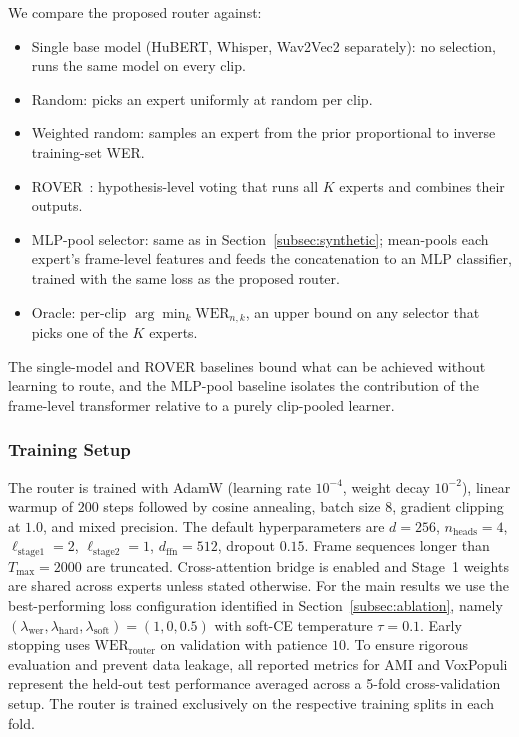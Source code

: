 \documentclass[journal]{IEEEtran}
\begin{document}
We compare the proposed router against:
\begin{itemize}
    \item Single base model (HuBERT, Whisper, Wav2Vec2 separately): no
    selection, runs the same model on every clip.
    \item Random: picks an expert uniformly at random per clip.
    \item Weighted random: samples an expert from the prior
    proportional to inverse training-set WER.
    \item ROVER~\cite{fiscus1997rover}: hypothesis-level voting that
    runs all $K$ experts and combines their outputs.
    \item MLP-pool selector: same as in
    Section~\ref{subsec:synthetic}; mean-pools each expert's
    frame-level features and feeds the concatenation to an MLP
    classifier, trained with the same loss as the proposed router.
    \item Oracle: per-clip $\arg\min_k\mathrm{WER}_{n,k}$, an upper
    bound on any selector that picks one of the $K$ experts.
\end{itemize}
The single-model and ROVER baselines bound what can be achieved
without learning to route, and the MLP-pool baseline isolates the
contribution of the frame-level transformer relative to a purely
clip-pooled learner.

\subsubsection{Training Setup}

The router is trained with AdamW (learning rate $10^{-4}$, weight
decay $10^{-2}$), linear warmup of $200$ steps followed by cosine
annealing, batch size $8$, gradient clipping at $1.0$, and mixed
precision. The default hyperparameters are $d=256$, $n_{\text{heads}}=4$,
$\ell_{\text{stage1}}=2$, $\ell_{\text{stage2}}=1$,
$d_{\text{ffn}}=512$, dropout $0.15$. Frame sequences longer than
$T_{\max}=2000$ are truncated. Cross-attention bridge is enabled and
Stage~1 weights are shared across experts unless stated otherwise.
For the main results we use the best-performing loss configuration
identified in Section~\ref{subsec:ablation}, namely
$(\lambda_{\text{wer}},\lambda_{\text{hard}},\lambda_{\text{soft}})=(1,0,0.5)$
with soft-CE temperature $\tau=0.1$. Early stopping uses
$\mathrm{WER}_{\text{router}}$ on validation with patience $10$. To ensure rigorous evaluation and prevent data leakage, all reported metrics for AMI and VoxPopuli represent the held-out test performance averaged across a 5-fold cross-validation setup. The router is trained exclusively on the respective training splits in each fold.
\end{document}
